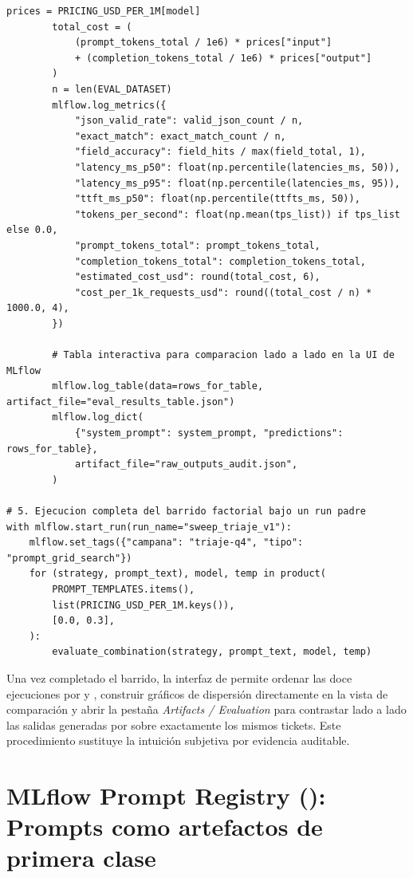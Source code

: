 \begin{lstlisting}[style=python, caption={Barrido sistemático de 3 plantillas $\times$ 2 temperaturas $\times$ 2 modelos registrado en MLflow Tracking.}, label={lst:prompt-sweep}]
        prices = PRICING_USD_PER_1M[model]
        total_cost = (
            (prompt_tokens_total / 1e6) * prices["input"]
            + (completion_tokens_total / 1e6) * prices["output"]
        )
        n = len(EVAL_DATASET)
        mlflow.log_metrics({
            "json_valid_rate": valid_json_count / n,
            "exact_match": exact_match_count / n,
            "field_accuracy": field_hits / max(field_total, 1),
            "latency_ms_p50": float(np.percentile(latencies_ms, 50)),
            "latency_ms_p95": float(np.percentile(latencies_ms, 95)),
            "ttft_ms_p50": float(np.percentile(ttfts_ms, 50)),
            "tokens_per_second": float(np.mean(tps_list)) if tps_list else 0.0,
            "prompt_tokens_total": prompt_tokens_total,
            "completion_tokens_total": completion_tokens_total,
            "estimated_cost_usd": round(total_cost, 6),
            "cost_per_1k_requests_usd": round((total_cost / n) * 1000.0, 4),
        })

        # Tabla interactiva para comparacion lado a lado en la UI de MLflow
        mlflow.log_table(data=rows_for_table, artifact_file="eval_results_table.json")
        mlflow.log_dict(
            {"system_prompt": system_prompt, "predictions": rows_for_table},
            artifact_file="raw_outputs_audit.json",
        )

# 5. Ejecucion completa del barrido factorial bajo un run padre
with mlflow.start_run(run_name="sweep_triaje_v1"):
    mlflow.set_tags({"campana": "triaje-q4", "tipo": "prompt_grid_search"})
    for (strategy, prompt_text), model, temp in product(
        PROMPT_TEMPLATES.items(),
        list(PRICING_USD_PER_1M.keys()),
        [0.0, 0.3],
    ):
        evaluate_combination(strategy, prompt_text, model, temp)
\end{lstlisting}

Una vez completado el barrido, la interfaz de  permite ordenar las doce ejecuciones por  y , construir gráficos de dispersión directamente en la vista de comparación y abrir la pestaña \textit{Artifacts / Evaluation} para contrastar lado a lado las salidas generadas por  sobre exactamente los mismos tickets. Este procedimiento sustituye la intuición subjetiva por evidencia auditable.

\section[MLflow Prompt Registry]{MLflow Prompt Registry (\texorpdfstring{}{mlflow.genai}): Prompts como artefactos de primera clase}\label{sec:prompt-registry}

